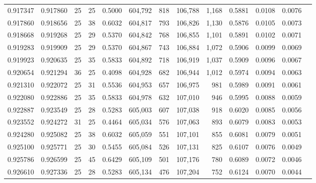 \begin{tabular}{rrrrrrrrrrrrr}
0.917347 & 0.917860 &    25 &  25 &                                     0.5000 & 604,792 &     818 & 106,788 &   1,168 & 0.5881 & 0.0108 & 0.0076 \\
0.917860 & 0.918656 &    25 &  38 &                                     0.6032 & 604,817 &     793 & 106,826 &   1,130 & 0.5876 & 0.0105 & 0.0073 \\
0.918668 & 0.919268 &    25 &  29 &                                     0.5370 & 604,842 &     768 & 106,855 &   1,101 & 0.5891 & 0.0102 & 0.0071 \\
0.919283 & 0.919909 &    25 &  29 &                                     0.5370 & 604,867 &     743 & 106,884 &   1,072 & 0.5906 & 0.0099 & 0.0069 \\
0.919923 & 0.920635 &    25 &  35 &                                     0.5833 & 604,892 &     718 & 106,919 &   1,037 & 0.5909 & 0.0096 & 0.0067 \\
0.920654 & 0.921294 &    36 &  25 &                                     0.4098 & 604,928 &     682 & 106,944 &   1,012 & 0.5974 & 0.0094 & 0.0063 \\
0.921310 & 0.922072 &    25 &  31 &                                     0.5536 & 604,953 &     657 & 106,975 &     981 & 0.5989 & 0.0091 & 0.0061 \\
0.922080 & 0.922886 &    25 &  35 &                                     0.5833 & 604,978 &     632 & 107,010 &     946 & 0.5995 & 0.0088 & 0.0059 \\
0.922887 & 0.923549 &    25 &  28 &                                     0.5283 & 605,003 &     607 & 107,038 &     918 & 0.6020 & 0.0085 & 0.0056 \\
0.923552 & 0.924272 &    31 &  25 &                                     0.4464 & 605,034 &     576 & 107,063 &     893 & 0.6079 & 0.0083 & 0.0053 \\
0.924280 & 0.925082 &    25 &  38 &                                     0.6032 & 605,059 &     551 & 107,101 &     855 & 0.6081 & 0.0079 & 0.0051 \\
0.925100 & 0.925771 &    25 &  30 &                                     0.5455 & 605,084 &     526 & 107,131 &     825 & 0.6107 & 0.0076 & 0.0049 \\
0.925786 & 0.926599 &    25 &  45 &                                     0.6429 & 605,109 &     501 & 107,176 &     780 & 0.6089 & 0.0072 & 0.0046 \\
0.926610 & 0.927336 &    25 &  28 &                                     0.5283 & 605,134 &     476 & 107,204 &     752 & 0.6124 & 0.0070 & 0.0044 \\

\end{tabular}
